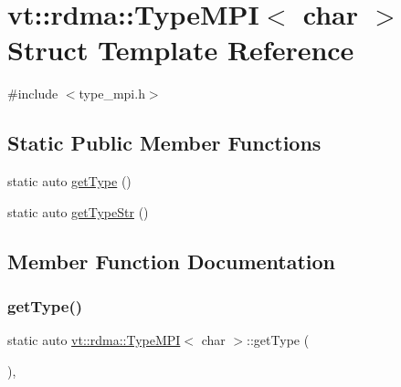 \hypertarget{structvt_1_1rdma_1_1_type_m_p_i_3_01char_01_4}{}\section{vt\+:\+:rdma\+:\+:Type\+M\+PI$<$ char $>$ Struct Template Reference}
\label{structvt_1_1rdma_1_1_type_m_p_i_3_01char_01_4}


{\ttfamily \#include $<$type\+\_\+mpi.\+h$>$}

\subsection*{Static Public Member Functions}
\begin{DoxyCompactItemize}
\item 
static auto \hyperlink{structvt_1_1rdma_1_1_type_m_p_i_3_01char_01_4_a2613985be89e890c92ed067d9ad7eb49}{get\+Type} ()
\item 
static auto \hyperlink{structvt_1_1rdma_1_1_type_m_p_i_3_01char_01_4_a4b13bbf68d6655c690b4e05f7892a1e0}{get\+Type\+Str} ()
\end{DoxyCompactItemize}


\subsection{Member Function Documentation}
\mbox{\label{structvt_1_1rdma_1_1_type_m_p_i_3_01char_01_4_a2613985be89e890c92ed067d9ad7eb49}} 
\subsubsection{\texorpdfstring{get\+Type()}{getType()}}
{\footnotesize\ttfamily static auto \hyperlink{structvt_1_1rdma_1_1_type_m_p_i}{vt\+::rdma\+::\+Type\+M\+PI}$<$ char $>$\+::get\+Type (\begin{DoxyParamCaption}{ }\end{DoxyParamCaption})\hspace{0.3cm}{\ttfamily [inline]}, {\ttfamily [static]}}

\mbox{\label{structvt_1_1rdma_1_1_type_m_p_i_3_01char_01_4_a4b13bbf68d6655c690b4e05f7892a1e0}} 
